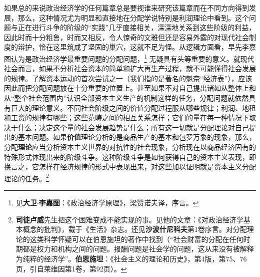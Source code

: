 \documentclass[fontset=fandol, a4paper, 12pt, openright]{ctexbook}
\begin{document}
如果总的来说政治经济学的任何篇章总是要视谁来研究该篇章而在不同方向得到发展，那么，这种情况尤为明显和直接地在分配学说特别是利润理论中看到。这个问题与正在进行斗争的阶级的“实践”几乎直接相关，深深地关系到这些阶级的利益，因此时而十分粗鲁，时而又相反，令人惊奇的文雅但还是容易外露的对现代社会制度的辩护，恰在这里筑成了坚固的巢穴，这就不足为怪。从逻辑方面看，早先李嘉图认为是政治经济学最重要问题的分配问题，\footnote{见\textbf{大卫}$\cdot$\textbf{李嘉图}：《政治经济学原理》，梁赞诺夫译，序言。} 无疑具有头等重要的意义。就现代社会而言，如果不分析社会资本的简单和扩大再生产过程，就不可能懂得社会发展的规律。了解资本运动的首次尝试之一（我们指的是著名的魁奈“经济表”），应该因此而把分配问题放在十分重要的位置上。甚至如果不对自己提出诸如从整体上和从“整个社会范围内”认识全部资本主义生产的机制这样的任务，分配问题就依然具有巨大的理论意义。不同社会阶级之间的价值分配过程服从哪些规律；利润、地租和工资的规律有哪些；这些范畴之间的相互关系怎样；它们的量在每一种情况下取决于什么；决定这个量的社会发展趋势是什么；所有这一切就是分配理论对自己提出的基本问题。如果\textbf{价值}理论分析的是商品生产的基本和包罗万象的现象，那么，分配\textbf{理论}应当分析资本主义世界的对抗性的社会现象，分析现在以商品经济固有的特殊形式体现出来的阶级斗争。这种阶级斗争是如何获得自己的资本主义表现，即换言之，它怎样在经济规律的形式中表现出来，对这些加以证明就是资本主义分配理论的任务。\footnote{\textbf{司徒卢威}先生把这个困难变成不能实现的事。见他的文章：《对政治经济学基本概念的批判》，载于《生活》杂志。还见\textbf{沙波什尼科夫}第1卷序言。对分配理论的这类科学怀疑可以在伯恩施坦的著作中找到（“社会财富的分配在任何时期都是权力和机构之间的问题。报酬问题是社会学的问题，这从来没有被解释为纯粹的经济学”。\textbf{伯恩施坦}：《社会主义的理论和历史》，第4版，第75、76页，引自莱维因第1卷，第92页）。}
\end{document}

